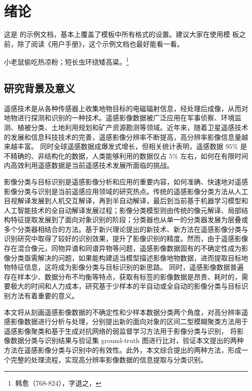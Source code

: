 
\chapter{绪论}
\label{cha:chap01}

这是 \bnuthesis{} 的示例文档，基本上覆盖了模板中所有格式的设置。建议大家在使用模
板之前，除了阅读《\bnuthesis{}用户手册》，这个示例文档也最好能看一看。

小老鼠偷吃热凉粉；短长虫环绕矮高粱。\footnote{韩愈（768-824），字退之，}


\section{研究背景及意义}
\label{sec:first}

遥感技术是从各种传感器上收集地物目标的电磁辐射信息，经处理后成像，从而对地物进行探测和识别的一种技术。遥感影像数据被广泛应用在军事侦察、环境监测、植被分类、土地利用规划和矿产资源勘测等领域\cite{lishihua2005}。近年来，随着卫星遥感技术的发展和信息科技技术的完善，遥感影像分辨率不断提高，高分辨率影像信息量越来越丰富。 同时全球遥感数据成爆发式增长，但相关统计表明，遥感数据 $95\%$ 是不精确的、非结构化的数据，人类能够利用的数据仅占 $5\%$ 左右\cite{zhangjun2010}，如何在有限时间内高效利用遥感数据是当前遥感技术发展所面临的挑战。

影像分类与目标识别是遥感影像分析和应用的重要内容，如何准确、快速地对遥感影像分类与识别是当前遥感应用领域的研究热点。传统的遥感影像分类方法从人工目视解译发展到人机交互解译，再到半自动解译，最后到当前基于机器学习模型和人工智能技术的全自动解译发展过程；影像分类模型则由传统的像元解译、局部结构特征提取发展到了面向对象识别的阶段；分类器也从单一的分类器发展为层叠或多个分类器相结合的方法\cite{lideren2012}。基于新兴理论提出的新技术、新方法在遥感影像分类与识别研究中取得了较好的识别效果，提升了影像识别的精度。然而，由于遥感影像存在混合像元，同物异谱和同谱异物等问题\cite{wulun2006}，遥感影像数据固有的不确定性成为影像分类亟需解决的问题，如果能构建适当模型描述影像地物数据，进而提取目标地物特征信息，这将成为影像分类与目标识别的新思路\cite{he2005comparison}。 同时，遥感影像数据普遍存在样本少、数据分布不均衡等特点，获取有标签的影像数据是昂贵、耗时的，需要极大的时间和人力成本，研究基于少样本的半自动或全自动的影像分类与目标识别方法有着重要的意义。

本文将从刻画遥感影像数据的不确定性和少样本数据分类两个角度，对高分辨率遥感影像数据进行分析与处理，分别提出新的面向对象的区间二型模糊聚类方法用于遥感影像聚类和基于生成对抗网络的弱监督学习方法用于影像分类与识别， 将影像数据分类与识别结果与验证集 ground-truth 图进行比对，验证本文提出的两种方法在遥感影像分类与识别中的有效性。此外，本文综合提出的两种方法，形成一个完整的处理流程，实现高分辨率影像数据的信息提取与分类识别。




